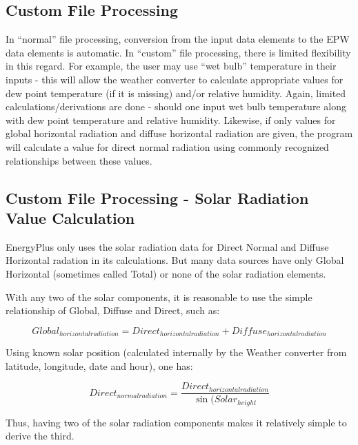\subsection{Custom File Processing}\label{custom-file-processing}

In ``normal'' file processing, conversion from the input data elements to the EPW data elements is automatic. In ``custom'' file processing, there is limited flexibility in this regard. For example, the user may use ``wet bulb'' temperature in their inputs - this will allow the weather converter to calculate appropriate values for dew point temperature (if it is missing) and/or relative humidity. Again, limited calculations/derivations are done - should one input wet bulb temperature along with dew point temperature and relative humidity. Likewise, if only values for global horizontal radiation and diffuse horizontal radiation are given, the program will calculate a value for direct normal radiation using commonly recognized relationships between these values.

\subsection{Custom File Processing - Solar Radiation Value Calculation}\label{custom-file-processing---solar-radiation-value-calculation}

EnergyPlus only uses the solar radiation data for Direct Normal and Diffuse Horizontal radation in its calculations. But many data sources have only Global Horizontal (sometimes called Total) or none of the solar radiation elements.

With any two of the solar components, it is reasonable to use the simple relationship of Global, Diffuse and Direct, such as:

\begin{equation}
Global_{horizontalradiation} = Direct_{horizontalradiation}+Diffuse_{horizontalradiation}
\end{equation}

Using known solar position (calculated internally by the Weather converter from latitude, longitude, date and hour), one has:

\begin{equation}
Direct_{normalradiation} = \frac{Direct_{horizontalradiation}}{\sin(Solar_{height}}
\end{equation}

Thus, having two of the solar radiation components makes it relatively simple to derive the third.


